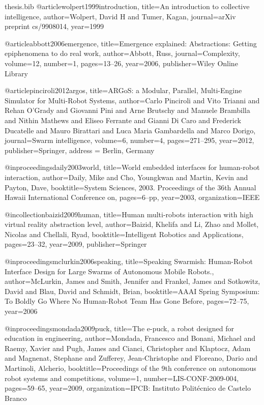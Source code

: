 \documentclass[oneside, a4paper, 12pt]{memoir}
\begin{document}
\begin{filecontents}{thesis.bib}
@article{wolpert1999introduction,
  title={An introduction to collective intelligence},
  author={Wolpert, David H and Tumer, Kagan},
  journal={arXiv preprint cs/9908014},
  year={1999}
}

@article{abbott2006emergence,
  title={Emergence explained: Abstractions: Getting epiphenomena to do real work},
  author={Abbott, Russ},
  journal={Complexity},
  volume={12},
  number={1},
  pages={13--26},
  year={2006},
  publisher={Wiley Online Library}
}

@article{pinciroli2012argos,
  title={{ARGoS}: a Modular, Parallel, Multi-Engine Simulator for Multi-Robot Systems},
  author={Carlo Pinciroli and Vito Trianni and Rehan O'Grady and Giovanni Pini and Arne Brutschy and Manuele Brambilla and Nithin Mathews and Eliseo Ferrante and Gianni {Di Caro} and Frederick Ducatelle and Mauro Birattari and Luca Maria Gambardella and Marco Dorigo},
  journal={Swarm intelligence},
  volume={6},
  number={4},
  pages={271--295},
  year={2012},
  publisher={Springer},
  address = {Berlin, Germany}
}

@inproceedings{daily2003world,
  title={World embedded interfaces for human-robot interaction},
  author={Daily, Mike and Cho, Youngkwan and Martin, Kevin and Payton, Dave},
  booktitle={System Sciences, 2003. Proceedings of the 36th Annual Hawaii International Conference on},
  pages={6--pp},
  year={2003},
  organization={IEEE}
}

@incollection{baizid2009human,
  title={Human multi-robots interaction with high virtual reality abstraction level},
  author={Baizid, Khelifa and Li, Zhao and Mollet, Nicolas and Chellali, Ryad},
  booktitle={Intelligent Robotics and Applications},
  pages={23--32},
  year={2009},
  publisher={Springer}
}

@inproceedings{mclurkin2006speaking,
  title={Speaking Swarmish: Human-Robot Interface Design for Large Swarms of Autonomous Mobile Robots.},
  author={McLurkin, James and Smith, Jennifer and Frankel, James and Sotkowitz, David and Blau, David and Schmidt, Brian},
  booktitle={AAAI Spring Symposium: To Boldly Go Where No Human-Robot Team Has Gone Before},
  pages={72--75},
  year={2006}
}

@inproceedings{mondada2009puck,
  title={The e-puck, a robot designed for education in engineering},
  author={Mondada, Francesco and Bonani, Michael and Raemy, Xavier and Pugh, James and Cianci, Christopher and Klaptocz, Adam and Magnenat, Stephane and Zufferey, Jean-Christophe and Floreano, Dario and Martinoli, Alcherio},
  booktitle={Proceedings of the 9th conference on autonomous robot systems and competitions},
  volume={1},
  number={LIS-CONF-2009-004},
  pages={59--65},
  year={2009},
  organization={IPCB: Instituto Polit{\'e}cnico de Castelo Branco}
}

\end{filecontents}



\end{document}
